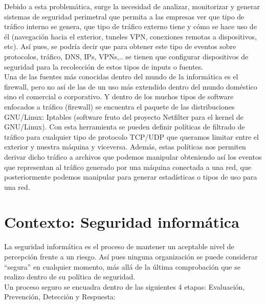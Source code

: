 Debido a esta problemática, surge la necesidad de analizar, monitorizar y generar sistemas de seguridad perimetral que permita a las empresas ver que tipo de tráfico interno se genera, que tipo de tráfico externo tiene y cómo se hace uso de él (navegación hacia el exterior, tuneles VPN, conexiones remotas a dispositivos, etc). Así pues, se podría decir que para obtener este tipo de eventos sobre protocolos, tráfico, DNS, IPs, VPNs,.. se tienen que configurar dispositivos de seguridad para la recolección de estos tipos de inputs o fuentes. \\

Una de las fuentes más conocidas dentro del mundo de la informática es el firewall, pero no así de las de un uso más extendido dentro del mundo doméstico sino el comercial o corporativo. Y dentro de los muchos tipos de software enfocados a tráfico (firewall) se encuentra el paquete de las distribuciones GNU/Linux: Iptables (software fruto del proyecto Netfilter para el kernel de GNU/Linux). Con esta herramienta se pueden definir políticas de filtrado de tráfico para cualquier tipo de protocolo TCP/UDP que queramos limitar entre el exterior y nuestra máquina y viceversa. Además, estas políticas nos permiten derivar dicho tráfico a archivos que podemos manipular obteniendo así los eventos que representan al tráfico generado por una máquina conectada a una red, que posteriormente podemos manipular para generar estadísticas o tipos de uso para una red. \\

\section{Contexto: Seguridad informática}

La seguridad informática es el proceso de mantener un aceptable nivel de percepción frente a un riesgo. Así pues ninguna organización se puede considerar ``segura'' en cualquier momento, más allá de la última comprobación que se realizo dentro de su política de seguridad.\\

Un proceso seguro se encuadra dentro de las siguientes 4 etapas: Evaluación, Prevención, Detección y Respuesta:

